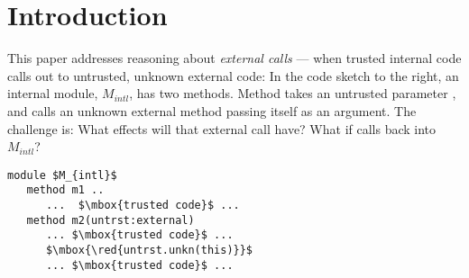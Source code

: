 



\section{Introduction}
\label{s:intro}

\begin{minipage}{.64\textwidth}
This paper addresses reasoning about \emph{external calls} --- when
trusted internal code calls out to untrusted, unknown external code:
In the code sketch to the right, 
an internal module, $M_{intl}$, has two methods. %
Method  takes an untrusted parameter ,
and calls an unknown external method  passing itself as an argument. 
The challenge is: %
What effects will that external call have?
What if  calls back into $M_{intl}$? %
\end{minipage}
\hfill
\begin{minipage}{.35\textwidth}
\begin{lstlisting}[mathescape=true, language=Chainmail,frame=none,numbers=none]
 module $M_{intl}$        
   method m1 ..
      ...  $\mbox{trusted code}$ ...  
   method m2(untrst:external) 
      ... $\mbox{trusted code}$ ...
      $\mbox{\red{untrst.unkn(this)}}$   
      ... $\mbox{trusted code}$ ...
\end{lstlisting}
\end{minipage}



